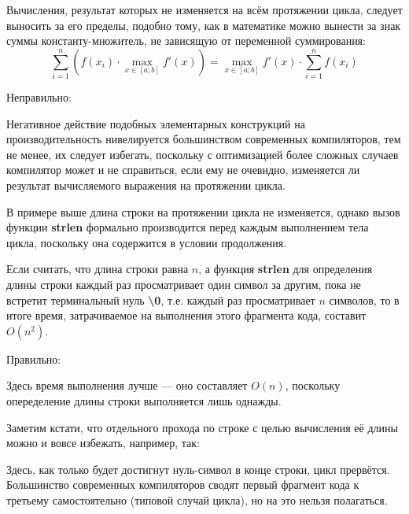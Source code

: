 \begin{typerror}
	\label{TE_duplicate-calculations-for}
	
	Вычисления, результат которых не изменяется на всём протяжении цикла, следует выносить за его пределы,
	подобно тому, как в математике можно вынести за знак суммы константу-множитель, не зависящую от переменной суммирования:
	$$
		\sum_{i=1}^{n}\left(f(x_i)\cdot\max\limits_{x\in[a;b]}f'(x)\right) = \max\limits_{x\in[a;b]}f'(x)\cdot\sum_{i=1}^{n}f(x_i)
	$$


	Неправильно:

	Негативное действие подобных элементарных конструкций на производительность нивелируется большинством современных компиляторов,
	тем не менее, их следует избегать, поскольку с оптимизацией более сложных случаев компилятор может и не справиться,
	если ему не очевидно, изменяется ли результат вычисляемого выражения на протяжении цикла.

	В примере выше длина строки на протяжении цикла не изменяется,
	однако вызов функции \textbf{strlen} формально производится перед каждым выполнением тела цикла,
	поскольку она содержится в условии продолжения.

	Если считать, что длина строки равна $n$,
	а функция \textbf{strlen} для определения длины строки каждый раз просматривает один символ за другим,
	пока не встретит терминальный нуль \textbf{\textbackslash0}, т.е. каждый раз просматривает $n$ символов,
	то в итоге время, затрачиваемое на выполнения этого фрагмента кода, составит $O(n^2)$.

	Правильно:

	Здесь время выполнения лучше --- оно составляет $O(n)$, поскольку опеределение длины строки выполняется лишь однажды.
	
	Заметим кстати, что отдельного прохода по строке с целью вычисления её длины можно и вовсе избежать, например, так:

	Здесь, как только будет достигнут нуль-символ в конце строки, цикл прервётся.
	Большинство современных компиляторов сводят первый фрагмент кода к третьему самостоятельно (типовой случай цикла),
	но на это нельзя полагаться.

\end{typerror}
